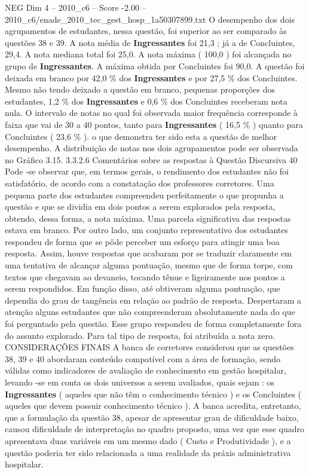 \begin{textsample}{NEG Dim 4 – 2010\_c6 – Score -2.00 – 2010\_c6/enade\_2010\_tec\_gest\_hosp\_1a50307899.txt}
O desempenho dos dois agrupamentos de estudantes, nessa questão, foi superior ao ser comparado às questões 38 e 39.
A nota média de \textbf{Ingressantes} foi 21,3 ; já a de Concluintes, 29,4.
A nota mediana total foi 25,0.
A nota máxima ( 100,0 ) foi alcançada no grupo de \textbf{Ingressantes}.
A máxima obtida por Concluintes foi 90,0.
A questão foi deixada em branco por 42,0 \% dos \textbf{Ingressantes} e por 27,5 \% dos Concluintes.
Mesmo não tendo deixado a questão em branco, pequenas proporções dos estudantes, 1,2 \% dos \textbf{Ingressantes} e 0,6 \% dos Concluintes receberam nota nula.
O intervalo de notas no qual foi observada maior frequência corresponde à faixa que vai de 30 a 40 pontos, tanto para \textbf{Ingressantes} ( 16,5 \% ) quanto para Concluintes ( 23,6 \% ). o que demonstra ter sido esta a questão de melhor desempenho.
A distribuição de notas nos dois agrupamentos pode ser observada no Gráfico 3.15. 3.3.2.6 Comentários sobre as respostas à Questão Discursiva 40 Pode -se observar que, em termos gerais, o rendimento dos estudantes não foi satisfatório, de acordo com a constatação dos professores corretores.
Uma pequena parte dos estudantes compreendeu perfeitamente o que propunha a questão e que se dividia em dois pontos a serem explorados pela resposta, obtendo, dessa forma, a nota máxima.
Uma parcela significativa das respostas estava em branco.
Por outro lado, um conjunto representativo dos estudantes respondeu de forma que se pôde perceber um esforço para atingir uma boa resposta.
Assim, houve respostas que acabaram por se traduzir claramente em uma tentativa de alcançar alguma pontuação, mesmo que de forma torpe, com textos que chegavam ao devaneio, tocando tênue e ligeiramente nos pontos a serem respondidos.
Em função disso, até obtiveram alguma pontuação, que dependia do grau de tangência em relação ao padrão de resposta.
Despertaram a atenção alguns estudantes que não compreenderam absolutamente nada do que foi perguntado pela questão.
Esse grupo respondeu de forma completamente fora do assunto explorado.
Para tal tipo de resposta, foi atribuída a nota zero.
CONSIDERAÇÕES FINAIS A banca de corretores considerou que as questões 38, 39 e 40 abordaram conteúdo compatível com a área de formação, sendo válidas como indicadores de avaliação de conhecimento em gestão hospitalar, levando -se em conta os dois universos a serem avaliados, quais sejam : os \textbf{Ingressantes} ( aqueles que não têm o conhecimento técnico ) e os Concluintes ( aqueles que devem possuir conhecimento técnico ).
A banca acredita, entretanto, que a formulação da questão 38, apesar de apresentar grau de dificuldade baixo, causou dificuldade de interpretação no quadro proposto, uma vez que esse quadro apresentava duas variáveis em um mesmo dado ( Custo e Produtividade ), e a questão poderia ter sido relacionada a uma realidade da práxis administrativa hospitalar.

\end{textsample}
